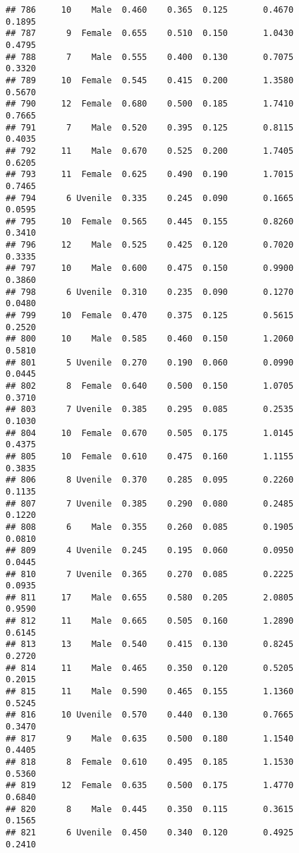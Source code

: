 \documentclass[
]{article}
\begin{document}
\begin{verbatim}
## 786     10    Male  0.460    0.365  0.125       0.4670         0.1895
## 787      9  Female  0.655    0.510  0.150       1.0430         0.4795
## 788      7    Male  0.555    0.400  0.130       0.7075         0.3320
## 789     10  Female  0.545    0.415  0.200       1.3580         0.5670
## 790     12  Female  0.680    0.500  0.185       1.7410         0.7665
## 791      7    Male  0.520    0.395  0.125       0.8115         0.4035
## 792     11    Male  0.670    0.525  0.200       1.7405         0.6205
## 793     11  Female  0.625    0.490  0.190       1.7015         0.7465
## 794      6 Uvenile  0.335    0.245  0.090       0.1665         0.0595
## 795     10  Female  0.565    0.445  0.155       0.8260         0.3410
## 796     12    Male  0.525    0.425  0.120       0.7020         0.3335
## 797     10    Male  0.600    0.475  0.150       0.9900         0.3860
## 798      6 Uvenile  0.310    0.235  0.090       0.1270         0.0480
## 799     10  Female  0.470    0.375  0.125       0.5615         0.2520
## 800     10    Male  0.585    0.460  0.150       1.2060         0.5810
## 801      5 Uvenile  0.270    0.190  0.060       0.0990         0.0445
## 802      8  Female  0.640    0.500  0.150       1.0705         0.3710
## 803      7 Uvenile  0.385    0.295  0.085       0.2535         0.1030
## 804     10  Female  0.670    0.505  0.175       1.0145         0.4375
## 805     10  Female  0.610    0.475  0.160       1.1155         0.3835
## 806      8 Uvenile  0.370    0.285  0.095       0.2260         0.1135
## 807      7 Uvenile  0.385    0.290  0.080       0.2485         0.1220
## 808      6    Male  0.355    0.260  0.085       0.1905         0.0810
## 809      4 Uvenile  0.245    0.195  0.060       0.0950         0.0445
## 810      7 Uvenile  0.365    0.270  0.085       0.2225         0.0935
## 811     17    Male  0.655    0.580  0.205       2.0805         0.9590
## 812     11    Male  0.665    0.505  0.160       1.2890         0.6145
## 813     13    Male  0.540    0.415  0.130       0.8245         0.2720
## 814     11    Male  0.465    0.350  0.120       0.5205         0.2015
## 815     11    Male  0.590    0.465  0.155       1.1360         0.5245
## 816     10 Uvenile  0.570    0.440  0.130       0.7665         0.3470
## 817      9    Male  0.635    0.500  0.180       1.1540         0.4405
## 818      8  Female  0.610    0.495  0.185       1.1530         0.5360
## 819     12  Female  0.635    0.500  0.175       1.4770         0.6840
## 820      8    Male  0.445    0.350  0.115       0.3615         0.1565
## 821      6 Uvenile  0.450    0.340  0.120       0.4925         0.2410

\end{verbatim}
\end{document}
